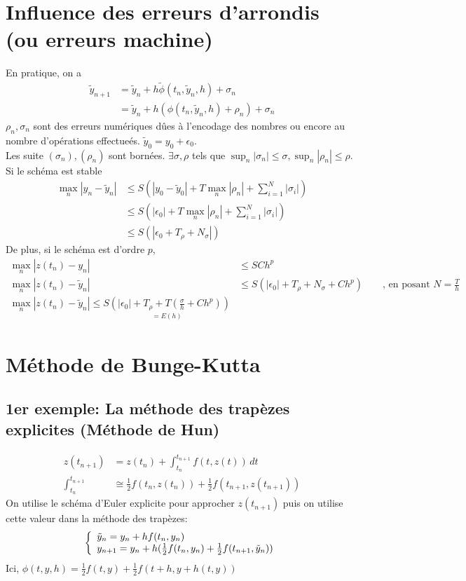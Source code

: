 \documentclass[]{report}
\begin{document}
    \section{Influence des erreurs d'arrondis (ou erreurs machine)}

    En pratique, on a
    \begin{align*}
        \tilde{y}_{n+1}&=\tilde{y}_n+h\tilde{\phi}(t_n,\tilde{y}_n,h)+\sigma_n\\
        &=\tilde{y}_n+h(\phi(t_n,\tilde{y}_n,h)+\rho_n)+\sigma_n
    \end{align*}
    $\rho_n,\sigma_n$ sont des erreurs numériques dûes à l'encodage des nombres ou encore au nombre d'opérations effectueés. $\tilde{y}_0=y_0+\epsilon_0$.\\
    Les suite $(\sigma_n),(\rho_n)$ sont bornées. $\exists \sigma,\rho$ tels que $\sup_n |\sigma_n|\le \sigma,\sup_n|\rho_n|\le \rho$. Si le schéma est stable
    \begin{align*}
        \max_n |y_n-\tilde{y}_n|&\le S(|y_0-\tilde{y}_0|+T\max_n|\rho_n|+\sum_{i=1}^{N}|\sigma_i|)\\
        &\le S(|\epsilon_0|+T\max_n|\rho_n|+\sum_{i=1}^{N}|\sigma_i|)\\
        &\le S(|\epsilon_0+T_\rho+N_\sigma|)
    \end{align*}
    De plus, si le schéma est d'ordre $p$,
    \begin{align*}
        \max_n |z(t_n)-y_n|&\le SC h^p\\
        \max_n |z(t_n)-\tilde{y}_n|&\le S(|\epsilon_0|+T_\rho+N_\sigma+Ch^p)\qquad \text{, en posant $N=\frac{T}{h}$}\\
        \max_n |z(t_n)-\tilde{y}_n|\le \underset{=E(h)}{S(|\epsilon_0|+T_\rho+T(\frac{\sigma}{h}+Ch^p))}
    \end{align*}

    \section{Méthode de Bunge-Kutta}

    \subsection{1er exemple: La méthode des trapèzes explicites (Méthode de Hun)}

    \begin{align*}
        z(t_{n+1})&=z(t_n)+\int_{t_n}^{t_{n+1}}f(t,z(t))\, dt\\
        \int_{t_n}^{t_{n+1}}&\cong \frac{1}{2} f(t_n,z(t_n))+\frac{1}{2}f(t_{n+1},z(t_{n+1}))
    \end{align*}
    On utilise le schéma d'Euler explicite pour approcher $z(t_{n+1})$ puis on utilise cette valeur dans la méthode des trapèzes:
    \[\left\{\begin{array}{ll} \tilde{y}_n=y_n+hf(t_n,y_n)\\ y_{n+1}=y_n+h(\frac{1}{2}f(t_n,y_n)+\frac{1}{2}f(t_{n+1},\tilde{y}_n)) \end{array} \right.\]
    Ici, $\phi(t,y,h)=\frac{1}{2}f(t,y)+\frac{1}{2}f(t+h,y+h(t,y))$
\end{document}
